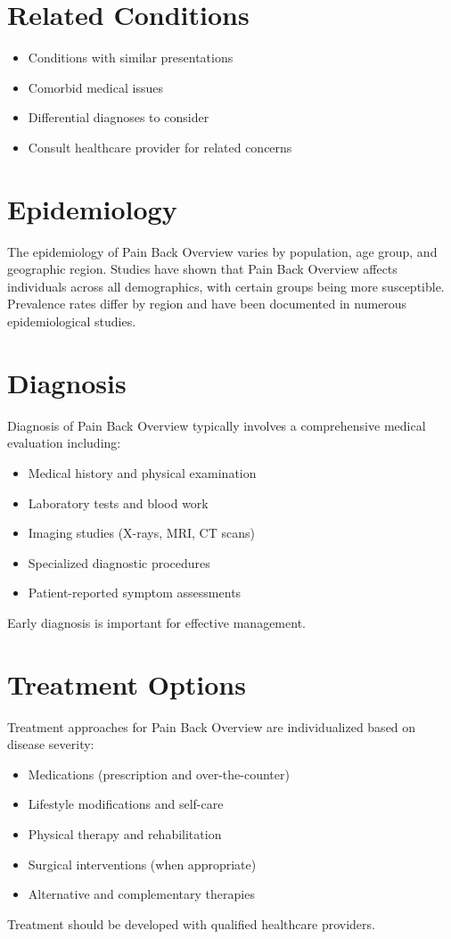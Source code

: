 \section*{Related Conditions}
\begin{itemize}
  \item Conditions with similar presentations
  \item Comorbid medical issues
  \item Differential diagnoses to consider
  \item Consult healthcare provider for related concerns
\end{itemize}

\section*{Epidemiology}
The epidemiology of Pain Back Overview varies by population, age group, and geographic region. Studies have shown that Pain Back Overview affects individuals across all demographics, with certain groups being more susceptible. Prevalence rates differ by region and have been documented in numerous epidemiological studies.

\section*{Diagnosis}
Diagnosis of Pain Back Overview typically involves a comprehensive medical evaluation including:
\begin{itemize}
  \item Medical history and physical examination
  \item Laboratory tests and blood work
  \item Imaging studies (X-rays, MRI, CT scans)
  \item Specialized diagnostic procedures
  \item Patient-reported symptom assessments
\end{itemize}
Early diagnosis is important for effective management.

\section*{Treatment Options}
Treatment approaches for Pain Back Overview are individualized based on disease severity:
\begin{itemize}
  \item Medications (prescription and over-the-counter)
  \item Lifestyle modifications and self-care
  \item Physical therapy and rehabilitation
  \item Surgical interventions (when appropriate)
  \item Alternative and complementary therapies
\end{itemize}
Treatment should be developed with qualified healthcare providers.

